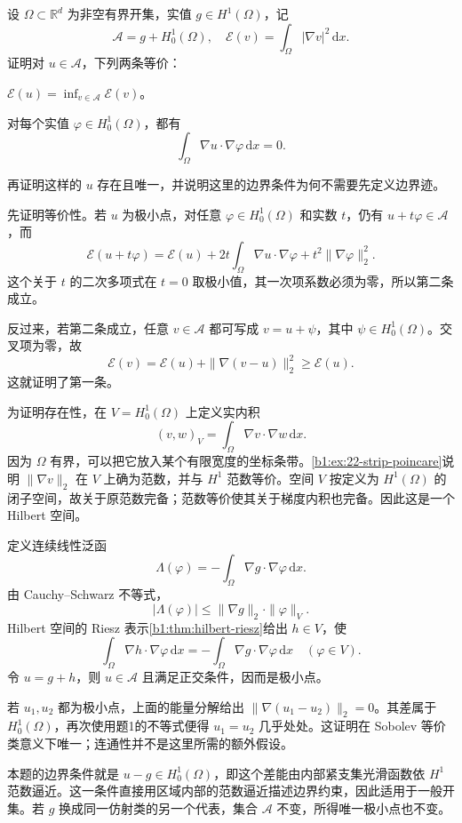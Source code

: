 \begin{optionalexercise}\label{b1:ex:22-dirichlet-minimum}
设 \(\Omega\subset\mathbb R^d\) 为非空有界开集，实值 \(g\in H^1(\Omega)\)，记
\[
 \mathcal A=g+H_0^1(\Omega),\quad
 \mathcal E(v)=\int_\Omega|\nabla v|^2\,\mathrm dx.
\]
证明对 \(u\in\mathcal A\)，下列两条等价：
\begin{equivalences}
\item\label{b1:item:22-energy-minimum}
\(\mathcal E(u)=\inf_{v\in\mathcal A}\mathcal E(v)\)。
\item\label{b1:item:22-energy-orthogonality}
对每个实值 \(\varphi\in H_0^1(\Omega)\)，都有
\[
 \int_\Omega\nabla u\cdot\nabla\varphi\,\mathrm dx=0.
\]
\end{equivalences}
再证明这样的 \(u\) 存在且唯一，并说明这里的边界条件为何不需要先定义边界迹。
\end{optionalexercise}
\begin{solution}
先证明等价性。若 \(u\) 为极小点，对任意 \(\varphi\in H_0^1(\Omega)\) 和实数 \(t\)，仍有 \(u+t\varphi\in\mathcal A\)，而
\[
 \mathcal E(u+t\varphi)
 =\mathcal E(u)+2t\int_\Omega\nabla u\cdot\nabla\varphi
                 +t^2\|\nabla\varphi\|_2^2.
\]
这个关于 \(t\) 的二次多项式在 \(t=0\) 取极小值，其一次项系数必须为零，所以第二条成立。

反过来，若第二条成立，任意 \(v\in\mathcal A\) 都可写成 \(v=u+\psi\)，其中 \(\psi\in H_0^1(\Omega)\)。交叉项为零，故
\[
 \mathcal E(v)=\mathcal E(u)+\|\nabla(v-u)\|_2^2
 \ge\mathcal E(u).
\]
这就证明了第一条。

为证明存在性，在 \(V=H_0^1(\Omega)\) 上定义实内积
\[
 (v,w)_V=\int_\Omega\nabla v\cdot\nabla w\,\mathrm dx.
\]
因为 \(\Omega\) 有界，可以把它放入某个有限宽度的坐标条带。\cref{b1:ex:22-strip-poincare}说明 \(\|\nabla v\|_2\) 在 \(V\) 上确为范数，并与 \(H^1\) 范数等价。空间 \(V\) 按定义为 \(H^1(\Omega)\) 的闭子空间，故关于原范数完备；范数等价使其关于梯度内积也完备。因此这是一个 Hilbert 空间。

定义连续线性泛函
\[
 \Lambda(\varphi)=-\int_\Omega\nabla g\cdot\nabla\varphi\,\mathrm dx.
\]
由 Cauchy--Schwarz 不等式，
\[
 |\Lambda(\varphi)|\le\|\nabla g\|_2\cdot\|\varphi\|_V.
\]
Hilbert 空间的 Riesz 表示\cref{b1:thm:hilbert-riesz}给出 \(h\in V\)，使
\[
 \int_\Omega\nabla h\cdot\nabla\varphi\,\mathrm dx
 =-\int_\Omega\nabla g\cdot\nabla\varphi\,\mathrm dx
 \quad(\varphi\in V).
\]
令 \(u=g+h\)，则 \(u\in\mathcal A\) 且满足正交条件，因而是极小点。

若 \(u_1,u_2\) 都为极小点，上面的能量分解给出
\(\|\nabla(u_1-u_2)\|_2=0\)。其差属于 \(H_0^1(\Omega)\)，再次使用题1的不等式便得 \(u_1=u_2\) 几乎处处。这证明在 Sobolev 等价类意义下唯一；连通性并不是这里所需的额外假设。

本题的边界条件就是 \(u-g\in H_0^1(\Omega)\)，即这个差能由内部紧支集光滑函数依 \(H^1\) 范数逼近。这一条件直接用区域内部的范数逼近描述边界约束，因此适用于一般开集。若 \(g\) 换成同一仿射类的另一个代表，集合 \(\mathcal A\) 不变，所得唯一极小点也不变。
\end{solution}
